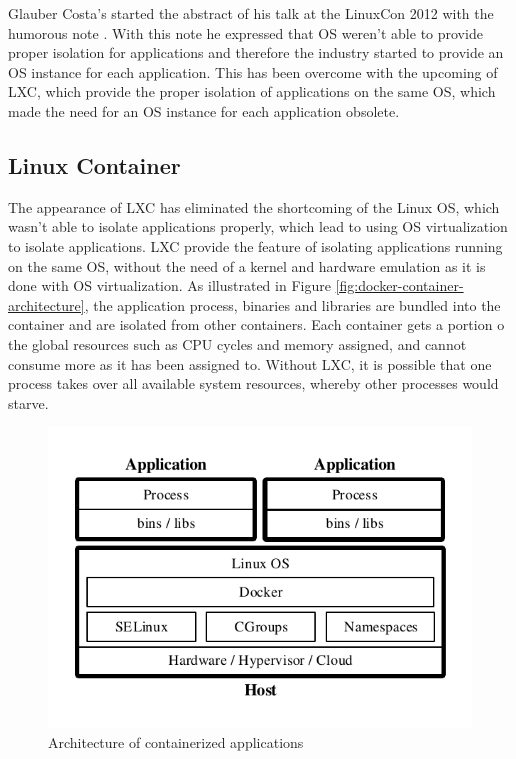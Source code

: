 Glauber Costa's started the abstract of his talk at the LinuxCon 2012 with the humorous note . With this note he expressed that OS weren't able to provide proper isolation for applications and therefore the industry started to provide an OS instance for each application. This has been overcome with the upcoming of LXC, which provide the proper isolation of applications on the same OS, which made the need for an OS instance for each application obsolete\cite{LxConCosta2012}.

\subsection{Linux Container}
\label{sec:docker-linux-container}
The appearance of LXC has eliminated the shortcoming of the Linux OS, which wasn't able to isolate applications properly, which lead to using OS virtualization to isolate applications. LXC provide the feature of isolating applications running on the same OS, without the need of a kernel and hardware emulation as it is done with OS virtualization. As illustrated in Figure \vref{fig:docker-container-architecture}, the application process, binaries and libraries are bundled into the container and are isolated from other containers. Each container gets a portion o the global resources such as CPU cycles and memory assigned, and cannot consume more as it has been assigned to. Without LXC, it is possible that one process takes over all available system resources, whereby other processes would starve.

\begin{figure}[htbp]
	\centering
	\includegraphics[scale=1]{images/docker-containerized-architecture.pdf}
	\caption{Architecture of containerized applications}
	\label{fig:docker-container-architecture}
\end{figure} 

